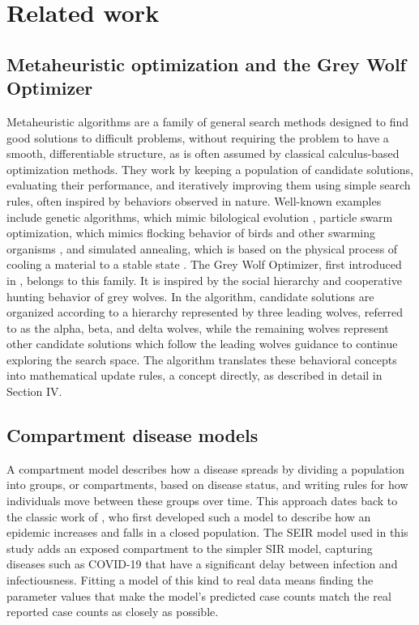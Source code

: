 \documentclass[journal]{IEEEtran}
\begin{document}
\section{Related work}

\subsection{Metaheuristic optimization and the Grey Wolf Optimizer}

Metaheuristic algorithms are a family of general search methods designed to find good solutions to difficult problems, without requiring the problem to have a smooth, differentiable structure, as is often assumed by classical calculus-based optimization methods. They work by keeping a population of candidate solutions, evaluating their performance, and iteratively improving them using simple search rules, often inspired by behaviors observed in nature. Well-known examples
include genetic algorithms, which mimic bilological evolution \cite{holland1975}, particle swarm optimization, which mimics flocking behavior of birds and other swarming organisms \cite{kennedy1995}, and simulated annealing, which is based on the physical process of cooling a material to a stable state \cite{kirkpatrick1983}.
The Grey Wolf Optimizer, first introduced in \cite{mirjalili2014}, belongs to this family. It is inspired by the social hierarchy and cooperative hunting behavior of grey wolves. In the algorithm, candidate solutions are organized according to a hierarchy represented by three leading wolves, referred to as the alpha, beta, and delta wolves, while the remaining wolves represent other candidate solutions which follow the leading wolves guidance to continue exploring the search space. The algorithm translates these behavioral concepts into mathematical update rules, a concept directly, as described in detail in Section IV.

\subsection{Compartment disease models}

A compartment model describes how a disease spreads by dividing a population into groups, or compartments, based on disease status, and writing rules for how individuals move between these groups over time. This approach dates back to the classic work of \cite{kermack1927}, who first developed such a model to describe how an epidemic increases and falls in a closed population. The SEIR model used in this study adds an exposed compartment to the simpler SIR model, capturing diseases such as COVID-19 that have a significant delay between infection and infectiousness. Fitting a model of this kind to real data means finding the parameter values that make the model's predicted case counts match the real reported case counts as closely as possible.
\end{document}
